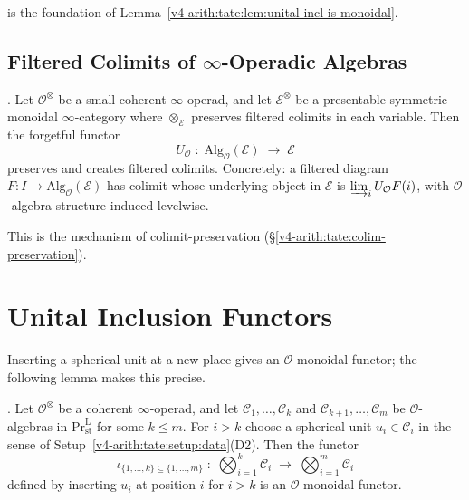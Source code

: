  is the foundation of
Lemma~\ref{v4-arith:tate:lem:unital-incl-is-monoidal}.

\subsection{Filtered Colimits of \(\infty\)-Operadic Algebras}

\begin{proposition}[HA~3.2.3.1]
\label{v4-arith:tate:prop:filtered-colim-operadic}
\ClaimStatusProvedElsewhere. Let \(\mathcal{O}^{\otimes}\) be a small
coherent \(\infty\)-operad, and let \(\mathcal{E}^{\otimes}\) be a
presentable symmetric monoidal \(\infty\)-category where
\(\otimes_{\mathcal{E}}\) preserves filtered colimits in each variable.
Then the forgetful functor
\[
U_{\mathcal{O}}\;:\;\mathrm{Alg}_{\mathcal{O}}(\mathcal{E})\;\longrightarrow\;\mathcal{E}
\]
preserves and creates filtered colimits. Concretely: a filtered
diagram \(F:I\to\mathrm{Alg}_{\mathcal{O}}(\mathcal{E})\) has colimit
whose underlying object in \(\mathcal{E}\) is \(\varinjlim_{i}U_{\mathcal{O}}F(i)\),
with \(\mathcal{O}\)-algebra structure induced levelwise.
\end{proposition}

This is the mechanism of colimit-preservation
(\S\ref{v4-arith:tate:colim-preservation}).

\section{Unital Inclusion Functors}
\label{v4-arith:tate:unital-inclusion}

Inserting a spherical unit at a new place gives an
\(\mathcal{O}\)-monoidal functor; the following lemma makes this precise.

\begin{lemma}
\label{v4-arith:tate:lem:unital-incl-is-monoidal}
\ClaimStatusProvedHere. Let \(\mathcal{O}^{\otimes}\) be a coherent
\(\infty\)-operad, and let \(\mathcal{C}_{1},\ldots,\mathcal{C}_{k}\)
and \(\mathcal{C}_{k+1},\ldots,\mathcal{C}_{m}\) be
\(\mathcal{O}\)-algebras in \(\mathrm{Pr}^{\mathrm{L}}_{\mathrm{st}}\)
for some \(k\leq m\). For \(i>k\) choose a spherical unit
\(u_{i}\in\mathcal{C}_{i}\) in the sense of
Setup~\ref{v4-arith:tate:setup:data}(D2). Then the functor
\begin{equation}
\label{v4-arith:tate:eq:unital-incl}
\iota_{\{1,\ldots,k\}\subseteq\{1,\ldots,m\}}\;:\;
\bigotimes_{i=1}^{k}\mathcal{C}_{i}\;\longrightarrow\;\bigotimes_{i=1}^{m}\mathcal{C}_{i}
\end{equation}
defined by inserting \(u_{i}\) at position \(i\) for \(i>k\) is an
\(\mathcal{O}\)-monoidal functor.
\end{lemma}

